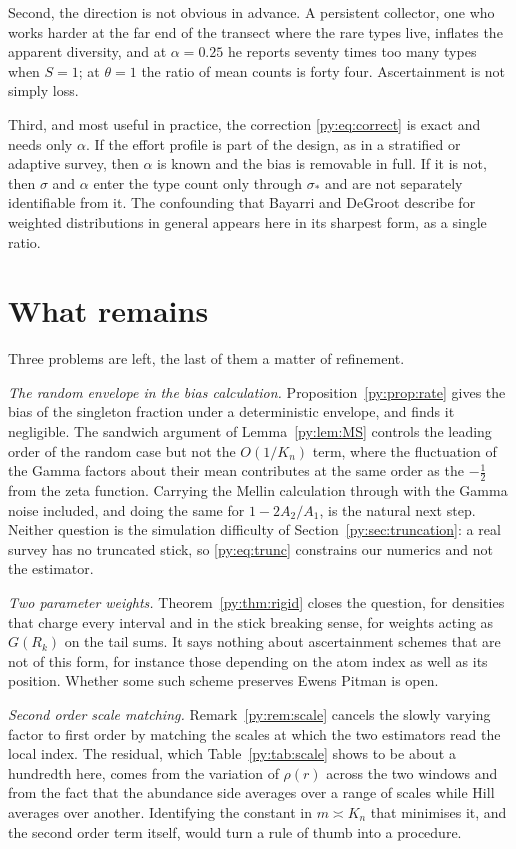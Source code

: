 Second, the direction is not obvious in advance. A persistent collector, one who works harder at
the far end of the transect where the rare types live, inflates the apparent diversity, and at
$\alpha = 0.25$ he reports seventy times too many types when $S = 1$; at $\theta = 1$ the ratio of mean counts is forty four. Ascertainment is not simply loss.

Third, and most useful in practice, the correction \eqref{py:eq:correct} is exact and needs only
$\alpha$. If the effort profile is part of the design, as in a stratified or adaptive survey, then
$\alpha$ is known and the bias is removable in full. If it is not, then $\sigma$ and $\alpha$ enter the type count only through $\sigma_*$ and are not
separately identifiable from it. The confounding that Bayarri and DeGroot describe for weighted
distributions in general appears here in its sharpest form, as a single ratio.

\section{What remains}
\label{py:sec:remains}

Three problems are left, the last of them a matter of refinement.

\emph{The random envelope in the bias calculation.} Proposition~\ref{py:prop:rate} gives the bias
of the singleton fraction under a deterministic envelope, and finds it negligible. The sandwich
argument of Lemma~\ref{py:lem:MS} controls the leading order of the random case but not the
$O(1/K_n)$ term, where the fluctuation of the Gamma factors about their mean contributes at the same
order as the $-\tfrac12$ from the zeta function. Carrying the Mellin calculation through with the
Gamma noise included, and doing the same for $1-2A_2/A_1$, is the natural next step. Neither
question is the simulation difficulty of Section~\ref{py:sec:truncation}: a real survey has no
truncated stick, so \eqref{py:eq:trunc} constrains our numerics and not the estimator.

\emph{Two parameter weights.} Theorem~\ref{py:thm:rigid} closes the question, for densities that charge every interval and in the stick breaking sense, for weights acting as
$G(R_k)$ on the tail sums. It says nothing about ascertainment schemes that are not of this form,
for instance those depending on the atom index as well as its position. Whether some such scheme
preserves Ewens Pitman is open.

\emph{Second order scale matching.} Remark~\ref{py:rem:scale} cancels the slowly varying factor
to first order by matching the scales at which the two estimators read the local index. The
residual, which Table~\ref{py:tab:scale} shows to be about a hundredth here, comes from the variation
of $\rho(r)$ across the two windows and from the fact that the abundance side averages over a range
of scales while Hill averages over another. Identifying the constant in $m \asymp K_n$ that
minimises it, and the second order term itself, would turn a rule of thumb into a procedure.

